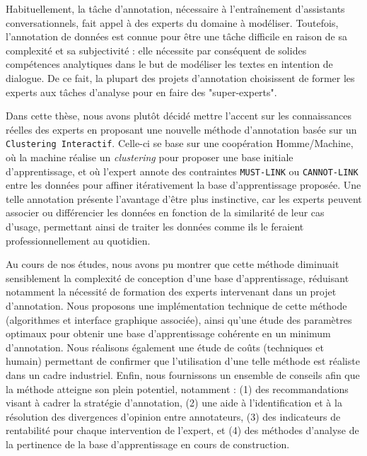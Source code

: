 \NumberAbstractPages
\begin{ThesisAbstract}

	\begin{FrenchAbstract}
	
		Habituellement, la tâche d'annotation, nécessaire à l'entraînement d'assistants conversationnels, fait appel à des experts du domaine à modéliser.
		Toutefois, l'annotation de données est connue pour être une tâche difficile en raison de sa complexité et sa subjectivité :
		elle nécessite par conséquent de solides compétences analytiques dans le but de modéliser les textes en intention de dialogue.
		De ce fait, la plupart des projets d'annotation choisissent de former les experts aux tâches d'analyse pour en faire des "super-experts".
		
		Dans cette thèse, nous avons plutôt décidé mettre l’accent sur les connaissances réelles des experts en proposant une nouvelle méthode d'annotation basée sur un \texttt{Clustering Interactif}.
		Celle-ci se base sur une coopération Homme/Machine, où la machine réalise un \textit{clustering} pour proposer une base initiale d'apprentissage, et où l'expert annote des contraintes \texttt{MUST-LINK} ou \texttt{CANNOT-LINK} entre les données pour affiner itérativement la base d'apprentissage proposée.
		Une telle annotation présente l'avantage d'être plus instinctive, car les experts peuvent associer ou différencier les données en fonction de la similarité de leur cas d'usage, permettant ainsi de traiter les données comme ils le feraient professionnellement au quotidien.
		
		Au cours de nos études, nous avons pu montrer que cette méthode diminuait sensiblement la complexité de conception d'une base d'apprentissage, réduisant notamment la nécessité de formation des experts intervenant dans un projet d'annotation.
		Nous proposons une implémentation technique de cette méthode (algorithmes et interface graphique associée), ainsi qu'une étude des paramètres optimaux pour obtenir une base d'apprentissage cohérente en un minimum d'annotation.
		Nous réalisons également une étude de coûts (techniques et humain) permettant de confirmer que l'utilisation d'une telle méthode est réaliste dans un cadre industriel.
		Enfin, nous fournissons un ensemble de conseils afin que la méthode atteigne son plein potentiel, notamment : (1) des recommandations visant à cadrer la stratégie d’annotation, (2) une aide à l'identification et à la résolution des divergences d'opinion entre annotateurs, (3) des indicateurs de rentabilité pour chaque intervention de l'expert, et (4) des méthodes d'analyse de la pertinence de la base d'apprentissage en cours de construction.
		

\end{FrenchAbstract}
\end{ThesisAbstract}
